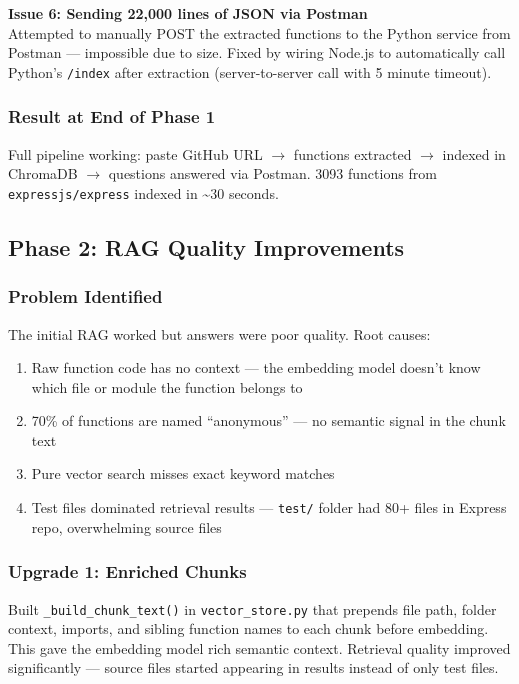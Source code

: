 \documentclass[a4paper,11pt]{article}
\begin{document}
\vspace{4pt}
\textbf{Issue 6: Sending 22,000 lines of JSON via Postman}\\
Attempted to manually POST the extracted functions to the Python service from Postman --- impossible due to size. Fixed by wiring Node.js to automatically call Python's \texttt{/index} after extraction (server-to-server call with 5 minute timeout).

\subsubsection{Result at End of Phase 1}
Full pipeline working: paste GitHub URL $\rightarrow$ functions extracted $\rightarrow$ indexed in ChromaDB $\rightarrow$ questions answered via Postman. 3093 functions from \texttt{expressjs/express} indexed in \textasciitilde30 seconds.

\subsection{Phase 2: RAG Quality Improvements}

\subsubsection{Problem Identified}
The initial RAG worked but answers were poor quality. Root causes:
\begin{enumerate}
    \item Raw function code has no context --- the embedding model doesn't know which file or module the function belongs to
    \item 70\% of functions are named ``anonymous'' --- no semantic signal in the chunk text
    \item Pure vector search misses exact keyword matches
    \item Test files dominated retrieval results --- \texttt{test/} folder had 80+ files in Express repo, overwhelming source files
\end{enumerate}

\subsubsection{Upgrade 1: Enriched Chunks}
Built \texttt{\_build\_chunk\_text()} in \texttt{vector\_store.py} that prepends file path, folder context, imports, and sibling function names to each chunk before embedding. This gave the embedding model rich semantic context. Retrieval quality improved significantly --- source files started appearing in results instead of only test files.
\end{document}
